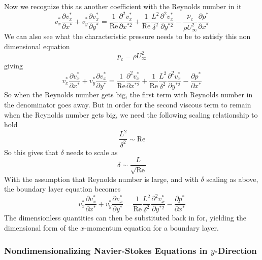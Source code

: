 Now we recognize this as another coefficient with the Reynolds number in it
\begin{equation*}
  v_{x}^{*}\frac{\partial{}v_{x}^{*}}{\partial{}x^{*}}+v_{y}^{*}\frac{\partial{}v_{x}^{*}}{\partial{}y^{*}}=\frac{1}{\text{Re}}\frac{\partial^{2}v_{x}^{*}}{\partial{}x^{*2}}+\frac{1}{\text{Re}}\frac{L^{2}}{\delta^{2}}\frac{\partial^{2}v_{x}^{*}}{\partial{}y^{*2}}-\frac{p_{c}}{\rho{}U_{\infty}^{2}}\frac{\partial{}p^{*}}{\partial{}x^{*}}
\end{equation*}
We can also see what the characteristic pressure needs to be to satisfy this non dimensional equation
\begin{equation*}
  p_{c}=\rho{}U_{\infty}^{2}
\end{equation*}
giving
\begin{equation*}
  v_{x}^{*}\frac{\partial{}v_{x}^{*}}{\partial{}x^{*}}+v_{y}^{*}\frac{\partial{}v_{x}^{*}}{\partial{}y^{*}}=\frac{1}{\text{Re}}\frac{\partial^{2}v_{x}^{*}}{\partial{}x^{*2}}+\frac{1}{\text{Re}}\frac{L^{2}}{\delta^{2}}\frac{\partial^{2}v_{x}^{*}}{\partial{}y^{*2}}-\frac{\partial{}p^{*}}{\partial{}x^{*}}
\end{equation*}
So when the Reynolds number gets big, the first term with Reynolds number in the denominator goes away.
But in order for the second viscous term to remain when the Reynolds number gets big, we need the following scaling relationship to hold
\begin{equation*}
  \frac{L^{2}}{\delta^{2}}\sim\text{Re}
\end{equation*}
So this gives that $\delta$ needs to scale as
\begin{equation*}
  \delta\sim\frac{L}{\sqrt{\text{Re}}}
\end{equation*}
With the assumption that Reynolds number is large, and with $\delta$ scaling as above, the boundary layer equation becomes
\begin{equation*}
  v_{x}^{*}\frac{\partial{}v_{x}^{*}}{\partial{}x^{*}}+v_{y}^{*}\frac{\partial{}v_{x}^{*}}{\partial{}y^{*}}=\frac{1}{\text{Re}}\frac{L^{2}}{\delta^{2}}\frac{\partial^{2}v_{x}^{*}}{\partial{}y^{*2}}-\frac{\partial{}p^{*}}{\partial{}x^{*}}
\end{equation*}
The dimensionless quantities can then be substituted back in for, yielding the dimensional form of the $x$-momentum equation for a boundary layer.

\subsubsection{Nondimensionalizing Navier-Stokes Equations in $y$-Direction}

